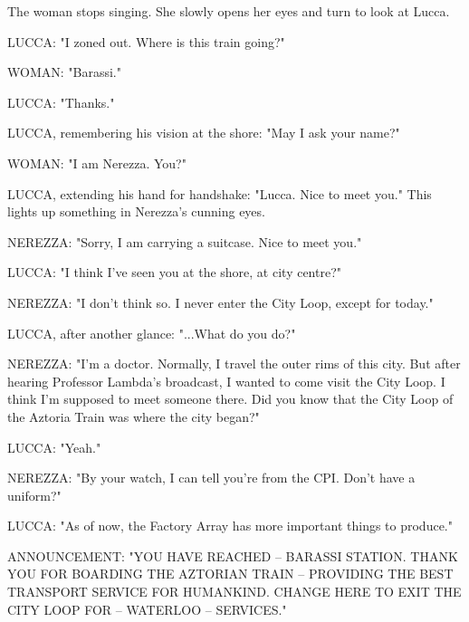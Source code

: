 \documentclass[11pt]{article}
\begin{document}
The woman stops singing.
She slowly opens her eyes and turn to look at Lucca.

LUCCA: "I zoned out. Where is this train going?"

WOMAN: "Barassi."

LUCCA: "Thanks."

LUCCA, remembering his vision at the shore: "May I ask your name?"

WOMAN: "I am Nerezza. You?"

LUCCA, extending his hand for handshake: "Lucca. Nice to meet you."
This lights up something in Nerezza's cunning eyes.

NEREZZA: "Sorry, I am carrying a suitcase. Nice to meet you."

LUCCA: "I think I've seen you at the shore, at city centre?"

NEREZZA: "I don't think so. 
I never enter the City Loop, except for today."

LUCCA, after another glance: "...What do you do?"

NEREZZA: "I'm a doctor. Normally, I travel the outer rims of this city.
But after hearing Professor Lambda's broadcast, I wanted to come visit the City Loop. 
I think I'm supposed to meet someone there.
Did you know that the City Loop of the Aztoria Train was where the city began?"

LUCCA: "Yeah."

NEREZZA: "By your watch, I can tell you're from the CPI.
Don't have a uniform?"

LUCCA: "As of now, the Factory Array has more important things to produce."

ANNOUNCEMENT: "YOU HAVE REACHED -- BARASSI STATION. 
THANK YOU FOR BOARDING THE AZTORIAN TRAIN -- PROVIDING THE BEST TRANSPORT SERVICE FOR HUMANKIND.
CHANGE HERE TO EXIT THE CITY LOOP FOR -- WATERLOO -- SERVICES."

\ 

\ 
\end{document}
